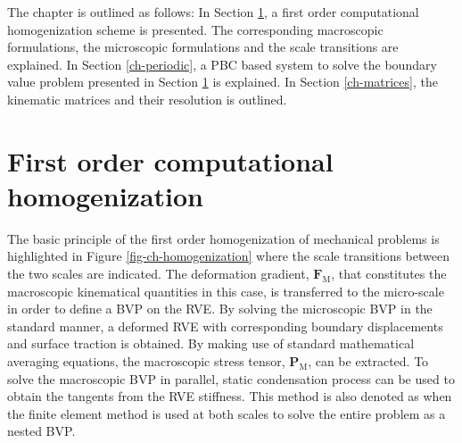 The chapter is outlined as follows: In Section \ref{ch-first}, a first order computational homogenization scheme is presented. The corresponding macroscopic formulations, the microscopic formulations and the scale transitions are explained. In Section \ref{ch-periodic}, a PBC based system to solve the boundary value problem presented in Section \ref{ch-first} is explained. In Section \ref{ch-matrices}, the kinematic matrices and their resolution is outlined. 

\section{First order computational homogenization}\label{ch-first}

The basic principle of the first order homogenization of mechanical problems is highlighted in Figure \ref{fig-ch-homogenization} where the scale transitions between the two scales are indicated. The deformation gradient, $\textbf{F}_\text{M}$, that constitutes the macroscopic kinematical quantities in this case, is transferred to the micro-scale in order to define a BVP on the RVE. By solving the microscopic BVP in the standard manner, a deformed RVE with corresponding boundary displacements and surface traction is obtained. By making use of standard mathematical averaging equations, the macroscopic stress tensor, $\textbf{P}_\text{M}$, can be extracted. To solve the macroscopic BVP  in parallel, static condensation process can be used to obtain the tangents from the RVE stiffness. This method is also denoted as \fee \cite{feyelFE2MultiscaleApproach2000,feyelMultilevelFiniteElement2003} when the finite element method is used at both scales to solve the entire problem as a nested BVP.


